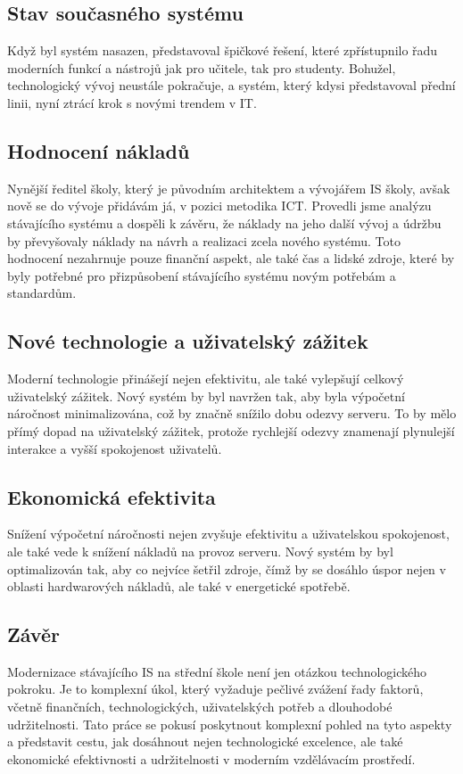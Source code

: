 \documentclass[FM,Proj]{tulthesis}
\begin{document}
\subsection*{Stav současného systému}
Když byl systém nasazen, představoval špičkové řešení, které zpřístupnilo řadu 
moderních funkcí a nástrojů jak pro učitele, tak pro studenty. Bohužel, 
technologický vývoj neustále pokračuje, a systém, který kdysi představoval 
přední linii, nyní ztrácí krok s novými trendem v IT.

\subsection*{Hodnocení nákladů}
Nynější ředitel školy, který je původním architektem a vývojářem IS školy, avšak nově
se do vývoje přidávám já, v pozici metodika ICT. Provedli jsme analýzu stávajícího systému
a dospěli k závěru, že náklady na jeho další vývoj a údržbu by převyšovaly náklady na 
návrh a realizaci zcela nového systému. Toto hodnocení nezahrnuje pouze finanční aspekt,
ale také čas a lidské zdroje, které by byly potřebné pro přizpůsobení stávajícího systému
 novým potřebám a standardům.

\subsection*{Nové technologie a uživatelský zážitek}
Moderní technologie přinášejí nejen efektivitu, ale také vylepšují celkový uživatelský zážitek.
Nový systém by byl navržen tak, aby byla výpočetní náročnost minimalizována, což by značně 
snížilo dobu odezvy serveru. To by mělo přímý dopad na uživatelský zážitek, protože 
rychlejší odezvy znamenají plynulejší interakce a vyšší spokojenost uživatelů.

\subsection*{Ekonomická efektivita}
Snížení výpočetní náročnosti nejen zvyšuje efektivitu a uživatelskou spokojenost, ale 
také vede k snížení nákladů na provoz serveru. Nový systém by byl optimalizován tak, 
aby co nejvíce šetřil zdroje, čímž by se dosáhlo úspor nejen v oblasti hardwarových nákladů,
ale také v energetické spotřebě.

\subsection*{Závěr}
Modernizace stávajícího IS na střední škole není jen otázkou technologického pokroku.
Je to komplexní úkol, který vyžaduje pečlivé zvážení řady faktorů, včetně finančních, 
technologických, uživatelských potřeb a dlouhodobé udržitelnosti. Tato práce se pokusí 
poskytnout komplexní pohled na tyto aspekty a představit cestu, jak dosáhnout nejen 
technologické excelence, ale také ekonomické efektivnosti a udržitelnosti v moderním 
vzdělávacím prostředí.
\end{document}
